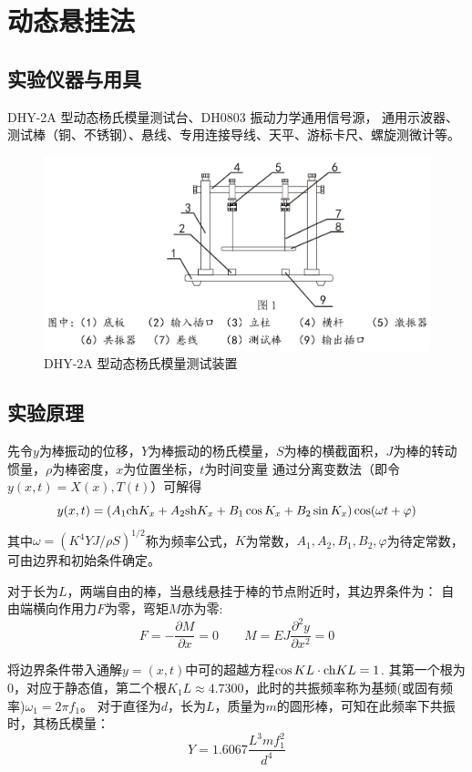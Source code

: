 \documentclass[UTF8]{article}
\theoremstyle{MyLineTheoremStyle} %
\theoremstyle{MyBlockTheoremStyle} %
\theoremstyle{MySubsubsectionStyle} %
\begin{document}
\section{动态悬挂法}
\subsection{实验仪器与用具}
DHY-2A 型动态杨氏模量测试台、DH0803 振动力学通用信号源，
通用示波器、
测试棒（铜、不锈钢）、悬线、专用连接导线、天平、游标卡尺、螺旋测微计等。

\begin{figure}[H]\centering
    \includegraphics[width=0.75\columnwidth]{assets/0/a36e12208fcd72455f93e4b950ef3249.png}
    \caption{DHY-2A 型动态杨氏模量测试装置}
\end{figure}


\subsection{实验原理}

先令$y$为棒振动的位移，$Y$为棒振动的杨氏模量，$S$为棒的横截面积，$J$为棒的转动惯量，$\rho$为棒密度，$x$为位置坐标，$t$为时间变量
通过分离变数法（即令$y(x,t)=X(x),T(t)$）可解得
\begin{equation}
    y(x,t)=\left(A_1{\rm ch}K_x+A_2{\rm sh}K_x+B_1\cos K_x+B_2\sin K_x \right)\cos (\omega t+\varphi)
\end{equation}
其中$\omega=\left(K^4YJ/\rho S\right)^{1/2}$称为频率公式，$K$为常数，$A_1,A_2,B_1,B_2,\varphi$为待定常数，可由边界和初始条件确定。

对于长为$L$，两端自由的棒，当悬线悬挂于棒的节点附近时，其边界条件为：
自由端横向作用力$F$为零，弯矩$M$亦为零:
\begin{equation}
   F=-\frac{\partial M}{\partial x} =0\qquad 
   M=EJ\frac{\partial^2y}{\partial x^2}=0
\end{equation}

将边界条件带入通解$y=(x,t)$中可的超越方程$\cos KL\cdot {\rm ch}KL=1$.
其第一个根为$0$，对应于静态值，第二个根$K_1L\approx 4.7300$，此时的共振频率称为基频(或固有频率)$\omega_1=2\pi f_1$。
对于直径为$d$，长为$L$，质量为$m$的圆形棒，可知在此频率下共振时，其杨氏模量：
\begin{equation}
   Y=1.6067\frac{L^3mf_1^2}{d^4} 
\end{equation}
\end{document}
